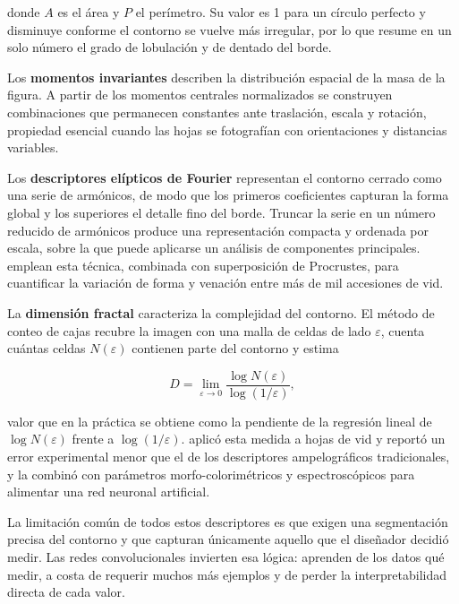 \noindent donde $A$ es el área y $P$ el perímetro. Su valor es 1 para un
círculo perfecto y disminuye conforme el contorno se vuelve más irregular,
por lo que resume en un solo número el grado de lobulación y de dentado del
borde.

Los \textbf{momentos invariantes} describen la distribución espacial de la
masa de la figura. A partir de los momentos centrales normalizados se
construyen combinaciones que permanecen constantes ante traslación, escala
y rotación, propiedad esencial cuando las hojas se fotografían con
orientaciones y distancias variables.

Los \textbf{descriptores elípticos de Fourier} representan el contorno
cerrado como una serie de armónicos, de modo que los primeros coeficientes
capturan la forma global y los superiores el detalle fino del borde.
Truncar la serie en un número reducido de armónicos produce una
representación compacta y ordenada por escala, sobre la que puede aplicarse
un análisis de componentes principales. \citet{chitwood2014} emplean esta
técnica, combinada con superposición de Procrustes, para cuantificar la
variación de forma y venación entre más de mil accesiones de vid.

La \textbf{dimensión fractal} caracteriza la complejidad del contorno. El
método de conteo de cajas recubre la imagen con una malla de celdas de lado
$\varepsilon$, cuenta cuántas celdas $N(\varepsilon)$ contienen parte del
contorno y estima

\begin{equation}
D = \lim_{\varepsilon \to 0} \frac{\log N(\varepsilon)}{\log (1/\varepsilon)},
\label{eq:fractal}
\end{equation}

\noindent valor que en la práctica se obtiene como la pendiente de la
regresión lineal de $\log N(\varepsilon)$ frente a $\log(1/\varepsilon)$.
\citet{mancuso2001} aplicó esta medida a hojas de vid y reportó un error
experimental menor que el de los descriptores ampelográficos
tradicionales, y \citet{fuentes2018} la combinó con parámetros
morfo-colorimétricos y espectroscópicos para alimentar una red neuronal
artificial.

La limitación común de todos estos descriptores es que exigen una
segmentación precisa del contorno y que capturan únicamente aquello que el
diseñador decidió medir. Las redes convolucionales invierten esa lógica:
aprenden de los datos qué medir, a costa de requerir muchos más ejemplos y
de perder la interpretabilidad directa de cada valor.


